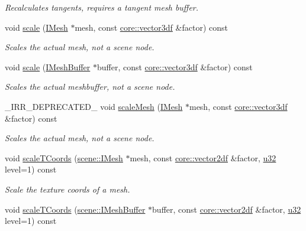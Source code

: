 \begin{DoxyCompactItemize}
\begin{DoxyCompactList}\small\item\em Recalculates tangents, requires a tangent mesh buffer. \end{DoxyCompactList}\item 
void \hyperlink{classirr_1_1scene_1_1IMeshManipulator_abd2a0bdd00605f638f619177e64b1cce}{scale} (\hyperlink{classirr_1_1scene_1_1IMesh}{I\+Mesh} $\ast$mesh, const \hyperlink{namespaceirr_1_1core_ae6e2b2a6c552833ebbd5b7463d03586b}{core\+::vector3df} \&factor) const
\begin{DoxyCompactList}\small\item\em Scales the actual mesh, not a scene node. \end{DoxyCompactList}\item 
void \hyperlink{classirr_1_1scene_1_1IMeshManipulator_a6aa8b1bd153c7e524e8200988078282f}{scale} (\hyperlink{classirr_1_1scene_1_1IMeshBuffer}{I\+Mesh\+Buffer} $\ast$buffer, const \hyperlink{namespaceirr_1_1core_ae6e2b2a6c552833ebbd5b7463d03586b}{core\+::vector3df} \&factor) const
\begin{DoxyCompactList}\small\item\em Scales the actual meshbuffer, not a scene node. \end{DoxyCompactList}\item 
\+\_\+\+I\+R\+R\+\_\+\+D\+E\+P\+R\+E\+C\+A\+T\+E\+D\+\_\+ void \hyperlink{classirr_1_1scene_1_1IMeshManipulator_a00f8ef80adfd5bb15644b64e8cd9f55e}{scale\+Mesh} (\hyperlink{classirr_1_1scene_1_1IMesh}{I\+Mesh} $\ast$mesh, const \hyperlink{namespaceirr_1_1core_ae6e2b2a6c552833ebbd5b7463d03586b}{core\+::vector3df} \&factor) const
\begin{DoxyCompactList}\small\item\em Scales the actual mesh, not a scene node. \end{DoxyCompactList}\item 
void \hyperlink{classirr_1_1scene_1_1IMeshManipulator_a2bc907891c8db77eebcad387ae3b31c3}{scale\+T\+Coords} (\hyperlink{classirr_1_1scene_1_1IMesh}{scene\+::\+I\+Mesh} $\ast$mesh, const \hyperlink{namespaceirr_1_1core_a116f90bd31515724b6235014ee2b74d5}{core\+::vector2df} \&factor, \hyperlink{namespaceirr_a0416a53257075833e7002efd0a18e804}{u32} level=1) const
\begin{DoxyCompactList}\small\item\em Scale the texture coords of a mesh. \end{DoxyCompactList}\item 
void \hyperlink{classirr_1_1scene_1_1IMeshManipulator_ad9e58b8382ab8d7a84b2383590f6d147}{scale\+T\+Coords} (\hyperlink{classirr_1_1scene_1_1IMeshBuffer}{scene\+::\+I\+Mesh\+Buffer} $\ast$buffer, const \hyperlink{namespaceirr_1_1core_a116f90bd31515724b6235014ee2b74d5}{core\+::vector2df} \&factor, \hyperlink{namespaceirr_a0416a53257075833e7002efd0a18e804}{u32} level=1) const

\end{DoxyCompactItemize}
